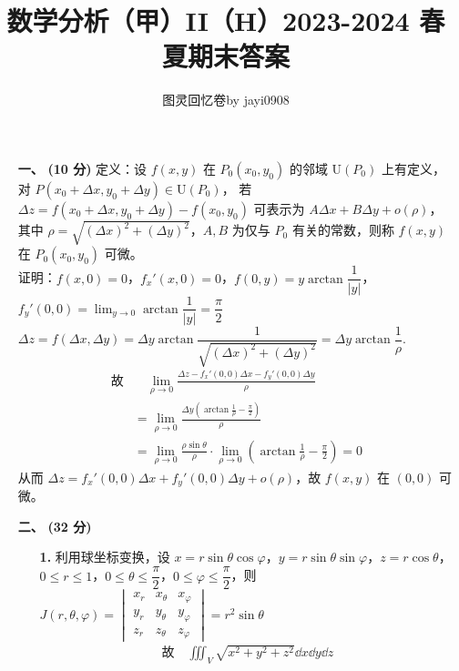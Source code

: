 \documentclass{ctexart}
\title{\vspace{-4em}\textbf{数学分析（甲）II（H）2023-2024 春夏期末答案}}
\author{图灵回忆卷\quad\quad by jayi0908}
\begin{document}
\maketitle

\begin{enumerate}
    \item[\textbf{一、}] \textbf{(10 分)} 定义：设 $f(x,y)$ 在 $P_0(x_0,y_0)$ 的邻域 $\mathrm{U}(P_0)$ 上有定义，对 $P(x_0+\Delta x, y_0+\Delta y)\in\mathrm{U}(P_0)$，
    若 $\Delta z = f(x_0+\Delta x, y_0+\Delta y)-f(x_0, y_0)$ 可表示为 
    $A\Delta x+B\Delta y+o(\rho)$，\\
    其中 $\rho=\sqrt{(\Delta x)^2+(\Delta y)^2}$，$A,B$ 为仅与 $P_0$ 有关的常数，则称 $f(x,y)$ 在 $P_0(x_0,y_0)$ 可微。 \\
    证明：$f(x,0)=0$，$f_x'(x,0)=0$，$f(0,y)=y\arctan{\dfrac{1}{\left\vert y \right\vert}}$，$f_y'(0,0)=\lim_{y \to 0}\arctan{\dfrac{1}{\left\vert y \right\vert }}=\dfrac{\pi}{2}$ \\
    $\Delta z=f(\Delta x,\Delta y)=\Delta y\arctan{\dfrac{1}{\sqrt{(\Delta x)^2+(\Delta y)^2}}}=\Delta y\arctan{\dfrac{1}{\rho}}.$
    \begin{align*} 
    \text{故}& \quad\lim_{\rho \to 0}\frac{\Delta z-f_x'(0,0)\Delta x-f_y'(0,0)\Delta y}{\rho} \\
    & =\lim_{\rho \to 0}\frac{\Delta y(\arctan{\frac{1}{\rho}-\frac{\pi}{2}})}{\rho} \\
    & =\lim_{\rho \to 0}\frac{\rho\sin\theta}{\rho}\cdot\lim_{\rho \to 0}(\arctan{\frac{1}{\rho}}-\frac{\pi}{2})=0
    \end{align*}
    从而 $\Delta z=f_x'(0,0)\Delta x+f_y'(0,0)\Delta y+o(\rho)$，故 $f(x,y)$ 在 $(0,0)$ 可微。
    \item[\textbf{二、}] \textbf{(32 分)}
    \begin{enumerate}
        \item[\textbf{1.}] 利用球坐标变换，设 $x=r\sin\theta\cos\varphi$，$y=r\sin\theta\sin\varphi$，$z=r\cos\theta$，
        $0\le r\le 1$，$0\le\theta\le\dfrac{\pi}{2}$，$0\le\varphi\le\dfrac{\pi}{2}$，则
        $J(r,\theta,\varphi)=\begin{vmatrix}
        x_r & x_{\theta} & x_{\varphi} \\
        y_r & y_{\theta} & y_{\varphi} \\
        z_r & z_{\theta} & z_{\varphi}
        \end{vmatrix}=r^2\sin\theta$
        \begin{align*}
        \text{故} \quad\iiint_{V}\sqrt{x^2+y^2+z^2}\dd{x}\dd{y}\dd{z} 

\end{align*}
\end{enumerate}
\end{enumerate}
\end{document}
